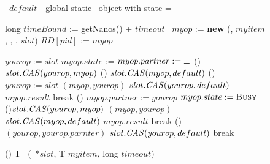 \begin{figure*}[!t]
	\removelatexerror
	
	\begin{algorithm}[H]
		
	\small
	\begin{flushleft}	
	\end{flushleft}
	
	\exInfo\ $default$ - global static \exInfo\ object with state = \emptyst
	
	\begin{procedure}[H]
		\caption{() T \exchange\ (\exInfo\ $*slot$, T $myitem$, long $timeout$)}
		
		long $timeBound$ := getNanos() + $timeout$ \;
		\exInfo\ $myop$ := \textbf{new} \exInfo (\waiting, $myitem$, \init, \init, $slot$)\;
		$RD[pid]$ := $myop$ 
		
		\While{\True} {
			 {
				\KwRet \timeout 
			}
			$yourop := slot$ \;
			 {
				\uCase{\emptyst} {
					$myop.state$ := \waiting {}
					$myop.partner := \mbox{$\bot$}$ \;
					\If () {$slot.\mbox{\textit{CAS}} (yourop, myop)$ \label{exchage-waiting-cas}} {
						\uIf () {$slot.\mbox{\textit{CAS}}(myop, default)$}{
							\KwRet \timeout\;
						} \uElse () {
							$yourop := slot$ \;
							 {
								\switchPair $(myop, yourop)$ 
								$slot.\mbox{\textit{CAS}} (yourop, default)$ 
							}
							\KwRet $myop.result$ \;
						}
					}
					break \;
				}
				\uCase (){\waiting} {
					$myop.partner := yourop$ 
					$myop.state := \mbox{\sc Busy}$ \;
					\uIf (){$slot.\mbox{\textit{CAS}} (yourop, myop)$ \label{exchange-busy-cas}} {
						\switchPair $(myop, yourop)$ 
						$slot.\mbox{\textit{CAS}} (myop, default)$ 
						\KwRet $myop.result$ \;
					}
					break \;
				}
				\uCase () {\busy} {
					\switchPair $(yourop, yourop.parnter)$ 
					$slot.\mbox{\textit{CAS}} (yourop, default)$ 
					break \;
				}
			}	
		} 
	\end{procedure}


\end{algorithm}
\end{figure*}
